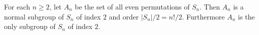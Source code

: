 \begin{theorem}
For each $n \geq 2$, let $A_n$ be the set of all even permutations of $S_n$. Then $A_n$ is a normal subgroup of $S_n$ of index $2$ and order $|S_n|/2 = n!/2$. Furthermore $A_n$ is the only subgroup of $S_n$ of index $2$.
\end{theorem}
